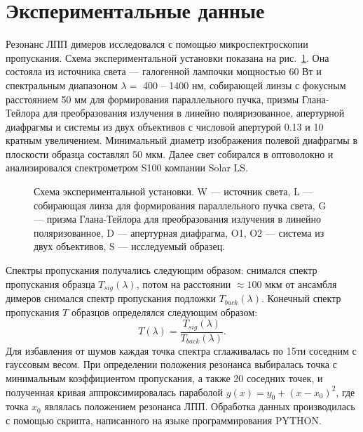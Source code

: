\section{Экспериментальные данные}

Резонанс ЛПП димеров исследовался с помощью микроспектроскопии пропускания. Схема экспериментальной установки показана на рис.~\ref{img:expsetup}. Она состояла из источника света --- галогенной лампочки мощностью 60 Вт и спектральным диапазоном $ \lambda =  $ 400 -- 1400 нм, собирающей линзы с фокусным расстоянием 50 мм для формирования параллельного пучка, призмы Глана-Тейлора для преобразования излучения в линейно поляризованное, апертурной диафрагмы и системы из двух объективов с числовой апертурой 0.13 и 10 кратным увеличением. Минимальный диаметр изображения полевой диафрагмы в плоскости образца составлял 50 мкм. Далее свет собирался в оптоволокно и анализировался спектрометром S100 компании Solar LS.
\begin{figure}
\caption{Схема экспериментальной установки. W --- источник света, L --- собирающая линза для формирования параллельного пучка света, G --- призма Глана-Тейлора для преобразования излучения в линейно поляризованное, D --- апертурная диафрагма, O1, O2 --- система из двух объективов, S --- исследуемый образец. }
\label{img:expsetup}
\end{figure}
Спектры пропускания получались следующим образом: снимался спектр пропускания образца $ T_{sig} (\lambda) $, потом на расстоянии $ \approx 100 $ мкм от ансамбля димеров снимался спектр пропускания подложки $ T_{back} (\lambda) $. Конечный спектр пропускания $ T $ образцов определялся следующим образом:
\begin{equation}
T(\lambda) = \frac{T_{sig} (\lambda)}{T_{back} (\lambda)}.
\end{equation}
Для избавления от шумов каждая точка спектра сглаживалась по 15ти соседним с гауссовым весом. При определении положения резонанса выбиралась точка с минимальным коэффициентом пропускания, а также 20 соседних точек, и полученная кривая аппроксимировалась параболой $ y(x) = y_0 + (x - x_0)^2 $, где точка $ x_0 $ являлась положением резонанса ЛПП. Обработка данных производилась с помощью скрипта, написанного на языке программирования PYTHON.

